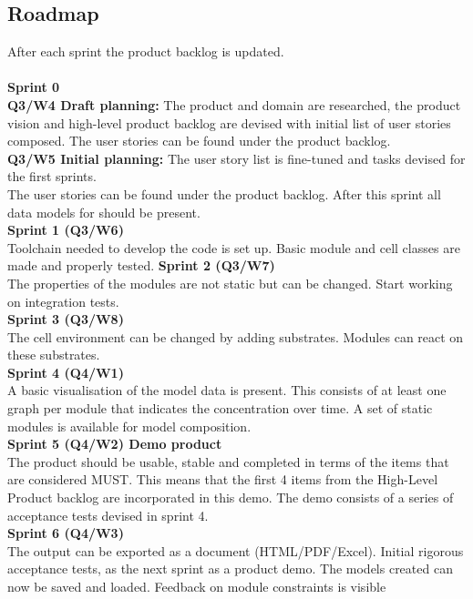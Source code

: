 \documentclass[10pt,a4paper]{report}
\begin{document}
		\subsection{Roadmap}
			After each sprint the product backlog is updated.\\\\
			\textbf{Sprint 0}\\
			\indent
				\textbf{Q3/W4 Draft planning:} The product and domain are researched, the product vision and high-level product backlog are devised with initial list of user stories composed. The user stories can be found under the product backlog.\\
			\indent
				\textbf{Q3/W5 Initial planning:} The user story list is fine-tuned and tasks devised for the first sprints.\\
				The user stories can be found under the product backlog. After this sprint all data models for should be present.\\
			\textbf{Sprint 1 (Q3/W6)}\\
				Toolchain needed to develop the code is set up. Basic module and cell classes are made and properly tested.
			\textbf{Sprint 2 (Q3/W7)}\\
				The properties of the modules are not static but can be changed. Start working on integration tests.\\
			\textbf{Sprint 3 (Q3/W8)}\\
				The cell environment can be changed by adding substrates. Modules can react on these substrates.\\
			\textbf{Sprint 4 (Q4/W1)}\\
				A basic visualisation of the model data is present. This consists of at least one graph per module that indicates the concentration over time. A set of static modules is available for model composition.\\
			\textbf{Sprint 5 (Q4/W2) Demo product}\\
				The product should be usable, stable and completed in terms of the items that are considered MUST. This means that the first 4 items from the High-Level Product backlog are incorporated in this demo. The demo consists of a series of acceptance tests devised in sprint 4.\\
			\textbf{Sprint 6 (Q4/W3)}\\
				The output can be exported as a document (HTML/PDF/Excel). Initial rigorous acceptance tests, as the next sprint as a product demo. The models created can now be saved and loaded. Feedback on module constraints is visible\\
\end{document}
